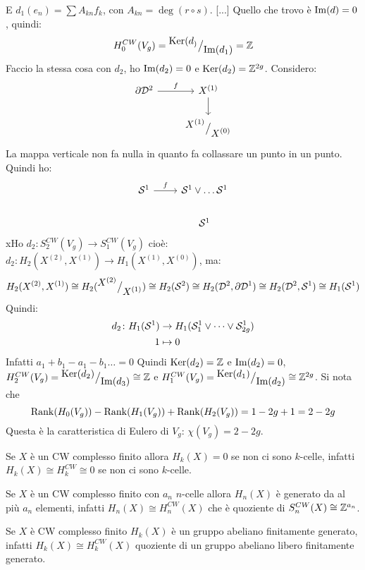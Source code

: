 E $ d_1(e_n) = \sum A_{kn}f_k $, con  $ A_{kn} = \deg {(r \circ s)} $.
[...]
Quello che trovo è $ \mathrm{Im}( d ) = 0 $, quindi:
\[
  H_0^{CW}(V_g) = {^{\textstyle \mathrm{Ker}( d_)}\big/_{\textstyle \mathrm{Im}( d_1 )}} = \mathbb{Z}
\]
Faccio la stessa cosa con $ d_2 $, ho $ \mathrm{Im}( d_2 ) = 0 $ e $ \mathrm{Ker}( d_2) = \mathbb{Z}^{2g} $.
Considero:
\[
  \begin{tikzcd}
    \partial \Disk{2} \rar{f} & X^{(1)} \dar  \\
    {} & \quot{X^{(1)}}{X^{(0)}}
  \end{tikzcd}
\]
La mappa verticale non fa nulla in quanto fa collassare un punto in un punto.
Quindi ho:
\[
  \begin{tikzcd}
    \Sph{1} \rar{f} & \Sph{1} \vee \dots \Sph{1} \\
    {} & \Sph{1}
  \end{tikzcd}
\]
xHo $ d_2 \colon S^{CW}_2(V_g) \to S_1^{CW}(V_g) $ cioè:
$ d_2 \colon H_2(X^{(2)}, X^{(1)}) \to H_1(X^{(1)}, X^{(0)}) $,
ma:
\[
  H_2(X^{(2)}, X^{(1)}) \cong H_2({^{\textstyle X^{(2)}}\big/_{\textstyle X^{(1)}}}) \cong H_2(\mathcal{S}^{2}) \cong H_2(\mathcal{D}^{2}, \partial \mathcal{D}^{1})
  \cong H_2(\mathcal{D}^{2}, \mathcal{S}^{1}) \cong H_1(\mathcal{S}^{1})
\]
Quindi:
\begin{align*}
  d_2 \colon H_1(\mathcal{S}^{1}) & \to H_1(\mathcal{S}^{1}_1 \vee \dots \vee \mathcal{S}^{1}_{2g}) \\
  1 & \mapsto 0
\end{align*}
Infatti $ a_1 + b_1 - a_1 - b_1 \dots = 0$
Quindi $ \mathrm{Ker}( d_2) = \mathbb{Z} $ e $ \mathrm{Im}( d_2 ) = 0 $,
$ H_2^{CW}(V_g) = {^{\textstyle \mathrm{Ker}( d_2)}\big/_{\textstyle \mathrm{Im}( d_3 )}} \cong \mathbb{Z} $ e
$ H_1^{CW}(V_g) = {^{\textstyle \mathrm{Ker}( d_1)}\big/_{\textstyle \mathrm{Im}( d_2 )}} \cong \mathbb{Z}^{2g} $.
Si nota che
\[
  \mathrm{Rank}( H_0(V_g) ) - \mathrm{Rank}( H_1(V_g) ) + \mathrm{Rank}( H_2(V_g) ) = 1 - 2g + 1 = 2 - 2g
\]
Questa è la caratteristica di Eulero di $ V_g $: $ \chi(V_g) = 2 - 2g $.

\begin{osservation}
  Se $ X $ è un CW complesso finito allora $ H_k(X) = 0 $ se non ci sono $ k $-celle,
  infatti $ H_k(X) \cong H_k^{CW} \cong 0 $ se non ci sono $ k $-celle.
\end{osservation}

\begin{osservation}
  Se $ X $ è un CW complesso finito con $ a_n $ $ n $-celle allora $ H_n(X) $ è
  generato da al più $ a_n $ elementi, infatti $ H_n(X) \cong H_n^{CW}(X) $ che è
  quoziente di $ S_n^{CW}(X) \cong \mathbb{Z}^{a_n} $.
\end{osservation}

\begin{corollary}
  Se $ X $ è CW complesso finito $ H_k(X) $ è un gruppo abeliano finitamente
  generato, infatti $ H_k(X) \cong H_k^{CW}(X) $ quoziente di un gruppo abeliano
  libero finitamente generato.
\end{corollary}

